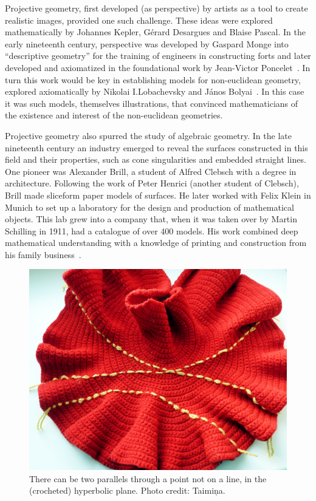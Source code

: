 \documentclass{notices}
\begin{document}
Projective geometry, first developed (as perspective) by artists as a tool to create realistic images, provided one such challenge. These ideas were explored mathematically by Johannes Kepler, G{\'e}rard Desargues and Blaise Pascal. In the early nineteenth century, perspective was developed by Gaspard Monge into ``descriptive geometry'' for the training of engineers in constructing forts and later developed and axiomatized in the foundational work by Jean-Victor Poncelet~\cites{Andersen:GA,Kemp:SOTWFBS}. 
In turn this work would be key in establishing models for non-euclidean geometry, explored axiomatically by Nikolai I.\@ Lobachevsky and J{\'a}nos Bolyai~\cite{Shenitzer:HNGECGS}. 
In this case it was such models, themselves illustrations, that convinced mathematicians of the existence and interest of the non-euclidean geometries. 

Projective geometry also spurred the study of algebraic geometry. In the late nineteenth century an industry %
emerged to reveal the surfaces constructed in this field and their properties, such as cone singularities and embedded straight lines. One pioneer %
was Alexander Brill, a student of Alfred Clebsch with a degree in architecture. Following the work of Peter Henrici (another student of Clebsch), Brill made sliceform paper models of surfaces. He later worked with Felix Klein in Munich to set up a laboratory for the design and production of mathematical %
objects.  %
This lab grew into a company that, when it was taken over by Martin Schilling in 1911, had a catalogue of over 400 models. His work combined deep mathematical understanding with a knowledge of printing and construction from his family business~\cites{Polo-Blanco:THGM, OConnor:AWB, Friedman:MMF12C}. 

\begin{figure}
    \includegraphics[width=1.\linewidth]{images/line3.jpg}
    \caption{There can be two parallels through a point not on a line, in the (crocheted) hyperbolic plane. Photo credit: Taimiņa.}
    \label{fig:hypercrochet}
\end{figure}
\end{document}
